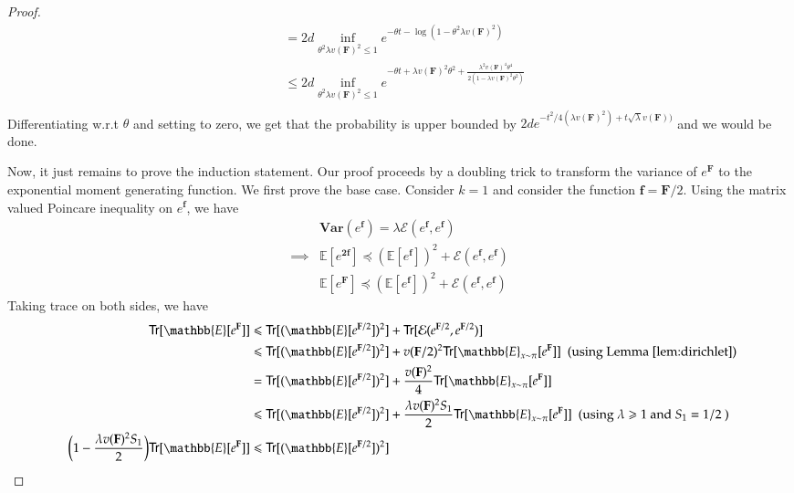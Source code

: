 \begin{proof}
\begin{align*}
  &=2d\inf\limits_{\theta^2 \lambda v(\mathbf{F})^2\leq 1}e^{-\theta t - \log(1-\theta^2 \lambda v(\mathbf{F})^2)}\\
  &\leq 2d\inf\limits_{\theta^2 \lambda v(\mathbf{F})^2\leq 1}e^{-\theta t +\lambda v(\mathbf{F})^2\theta^2 + \frac{\lambda^2 v(\mathbf{F})^4\theta^4}{2(1-\lambda v(\mathbf{F})^2\theta^2)}}\\
\end{align*}
Differentiating w.r.t $\theta$ and setting to zero, we get that the probability is upper bounded by $2de^{-t^2/4(\lambda v(\mathbf{F})^2)+t \sqrt{\lambda}v(\mathbf{F}))}$ and we would be done.

Now, it just remains to prove the induction statement. Our proof proceeds by a doubling trick to transform the variance of $e^\mathbf{F}$ to the exponential moment generating function. We first prove the base case. Consider $k=1$ and consider the function $\mathbf{f}=\mathbf{F}/2$. Using the matrix valued Poincare inequality on $e^\mathbf{f}$, we have
\begin{align*}
  &\mathbf{Var}(e^\mathbf{f}) = \lambda \mathcal{E}(e^\mathbf{f},e^{\mathbf{f}})\\
  \implies&\mathbb{E}[e^\mathbf{2f}] \preceq (\mathbb{E}[e^\mathbf{f}])^2 + \mathcal{E}(e^\mathbf{f},e^{\mathbf{f}})\\
  &\mathbb{E}[e^\mathbf{F}] \preceq (\mathbb{E}[e^\mathbf{f}])^2 + \mathcal{E}(e^\mathbf{f},e^{\mathbf{f}})
\end{align*}
Taking trace on both sides, we have
\begin{align*}
  \mathsf{Tr}[\mathbb{E}[e^\mathbf{F}]]&\leq \mathsf{Tr}[(\mathbb{E}[e^{\mathbf{F}/2}])^2] + \mathsf{Tr}[\mathcal{E}(e^{\mathbf{F}/2},e^{\mathbf{F}/2})]\\
  &\leq \mathsf{Tr}[(\mathbb{E}[e^{\mathbf{F}/2}])^2] + v(\mathbf{F}/2)^2\mathsf{Tr}[\mathbb{E}_{x\sim\pi}[e^{\mathbf{F}}]] \ \ \text{(using Lemma \ref{lem:dirichlet})}\\
  &=\mathsf{Tr}[(\mathbb{E}[e^{\mathbf{F}/2}])^2] + \frac{v(\mathbf{F})^2}{4}\mathsf{Tr}[\mathbb{E}_{x\sim\pi}[e^{\mathbf{F}}]]\\
  &\leq \mathsf{Tr}[(\mathbb{E}[e^{\mathbf{F}/2}])^2] + \frac{\lambda v(\mathbf{F})^2 S_1}{2}\mathsf{Tr}[\mathbb{E}_{x\sim\pi}[e^{\mathbf{F}}]] \ \ \text{(using }\lambda \geq 1\text{ and } S_1 = 1/2\text{ )}\\
  \hspace{0.5em}\bigg(1-\frac{\lambda v(\mathbf{F})^2 S_1}{2}\bigg)\mathsf{Tr}[\mathbb{E}[e^\mathbf{F}]] &\leq  \mathsf{Tr}[(\mathbb{E}[e^{\mathbf{F}/2}])^2]

\end{align*}
\end{proof}

